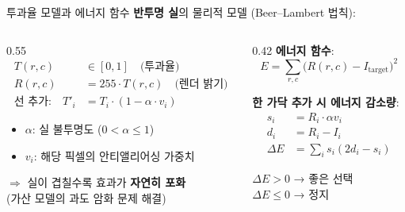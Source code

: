 \documentclass[10pt,aspectratio=169]{beamer}
\begin{document}
\begin{frame}{투과율 모델과 에너지 함수}
  \textbf{반투명 실}의 물리적 모델 (Beer--Lambert 법칙):

  \vspace{0.2cm}
  \begin{columns}[T]
    \begin{column}{0.55\textwidth}
      \begin{align}
        T(r,c) &\in [0,1] \quad \text{(투과율)} \\[2pt]
        R(r,c) &= 255 \cdot T(r,c) \quad \text{(렌더 밝기)} \\[4pt]
        \text{선 추가:}\quad T'_i &= T_i \cdot (1 - \alpha \cdot v_i)
      \end{align}

      \begin{itemize}
        \item $\alpha$: 실 불투명도 ($0 < \alpha \le 1$)
        \item $v_i$: 해당 픽셀의 안티앨리어싱 가중치
      \end{itemize}

      \vspace{0.2cm}
      $\Rightarrow$ 실이 겹칠수록 효과가 \textbf{자연히 포화}\\
      \quad\; (가산 모델의 과도 암화 문제 해결)
    \end{column}
    \begin{column}{0.42\textwidth}
      \textbf{에너지 함수}:
      \[
        E = \sum_{r,c} \bigl(R(r,c) - I_{\text{target}}\bigr)^2
      \]

      \textbf{한 가닥 추가 시 에너지 감소량}:
      \begin{align*}
        s_i &= R_i \cdot \alpha v_i \\
        d_i &= R_i - I_i \\[4pt]
        \Delta E &= \sum_i s_i(2d_i - s_i)
      \end{align*}

      $\Delta E > 0$ → 좋은 선택\\
      $\Delta E \le 0$ → 정지
    \end{column}
  \end{columns}
\end{frame}
\end{document}
